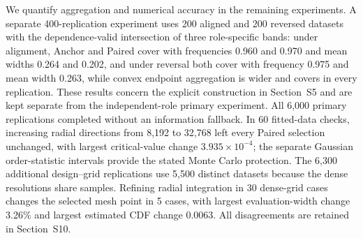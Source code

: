 We quantify aggregation and numerical accuracy in the remaining experiments. A separate 400-replication experiment uses 200 aligned and 200 reversed datasets with the dependence-valid intersection of three role-specific bands: under alignment, Anchor and Paired cover with frequencies 0.960 and 0.970 and mean widths 0.264 and 0.202, and under reversal both cover with frequency 0.975 and mean width 0.263, while convex endpoint aggregation is wider and covers in every replication. These results concern the explicit construction in Section~S5 and are kept separate from the independent-role primary experiment. All 6,000 primary replications completed without an information fallback. In 60 fitted-data checks, increasing radial directions from 8,192 to 32,768 left every Paired selection unchanged, with largest critical-value change $3.935\times10^{-4}$; the separate Gaussian order-statistic intervals provide the stated Monte Carlo protection. The 6,300 additional design--grid replications use 5,500 distinct datasets because the dense resolutions share samples. Refining radial integration in 30 dense-grid cases changes the selected mesh point in 5 cases, with largest evaluation-width change 3.26\% and largest estimated CDF change 0.0063. All disagreements are retained in Section~S10.
